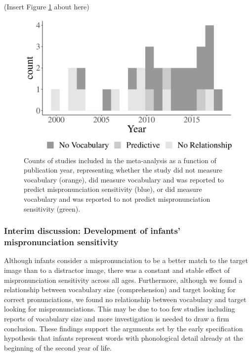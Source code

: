 \documentclass[
  man, noextraspace]{apa6}
\begin{document}
(Insert Figure \ref{fig:Vocabdescribe1} about here)

\begin{figure}
\centering
\includegraphics{VonHolzenBergmann_MPMetaAnalysis_files/figure-latex/Vocabdescribe1-1.pdf}
\caption{\label{fig:Vocabdescribe1}Counts of studies included in the meta-analysis as a function of publication year, representing whether the study did not measure vocabulary (orange), did measure vocabulary and was reported to predict mispronunciation sensitivity (blue), or did measure vocabulary and was reported to not predict mispronunciation sensitivity (green).}
\end{figure}

\hypertarget{interim-discussion-development-of-infants-mispronunciation-sensitivity}{%
\subsubsection{Interim discussion: Development of infants' mispronunciation sensitivity}\label{interim-discussion-development-of-infants-mispronunciation-sensitivity}}

Although infants consider a mispronunciation to be a better match to the target image than to a distractor image, there was a constant and stable effect of mispronunciation sensitivity across all ages. Furthermore, although we found a relationship between vocabulary size (comprehension) and target looking for correct pronunciations, we found no relationship between vocabulary and target looking for mispronunciations. This may be due to too few studies including reports of vocabulary size and more investigation is needed to draw a firm conclusion. These findings support the arguments set by the early specification hypothesis that infants represent words with phonological detail already at the beginning of the second year of life.
\end{document}
